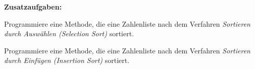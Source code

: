 \medskip
\noindent \textbf{Zusatzaufgaben:}

\begin{compactenum}[a)]
\setcounter{enumi}{5}
\item Programmiere eine Methode, die eine Zahlenliste nach dem Verfahren
\emph{Sortieren durch Auswählen (Selection Sort)} sortiert.

\item Programmiere eine Methode, die eine Zahlenliste nach dem Verfahren
\emph{Sortieren durch Einfügen (Insertion Sort)} sortiert.
\end{compactenum}
